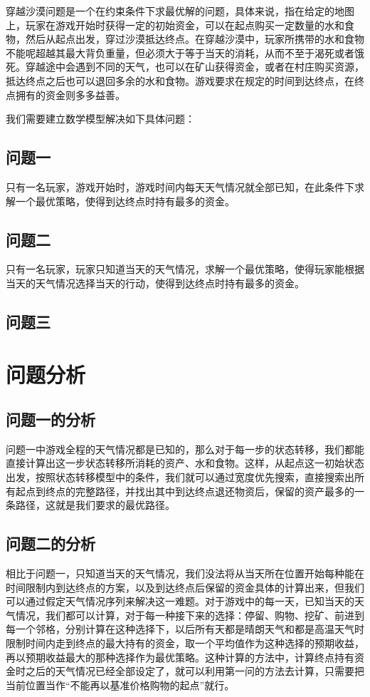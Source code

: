 \documentclass[withoutpreface,bwprint]{cumcmthesis} %
\begin{document}
穿越沙漠问题是一个在约束条件下求最优解的问题，具体来说，指在给定的地图上，玩家在游戏开始时获得一定的初始资金，可以在起点购买一定数量的水和食物，然后从起点出发，穿过沙漠抵达终点。在穿越沙漠中，玩家所携带的水和食物不能呢超越其最大背负重量，但必须大于等于当天的消耗，从而不至于渴死或者饿死。穿越途中会遇到不同的天气，也可以在矿山获得资金，或者在村庄购买资源，抵达终点之后也可以退回多余的水和食物。游戏要求在规定的时间到达终点，在终点拥有的资金则多多益善。

我们需要建立数学模型解决如下具体问题：

\subsection{问题一}
只有一名玩家，游戏开始时，游戏时间内每天天气情况就全部已知，在此条件下求解一个最优策略，使得到达终点时持有最多的资金。

\subsection{问题二}
只有一名玩家，玩家只知道当天的天气情况，求解一个最优策略，使得玩家能根据当天的天气情况选择当天的行动，使得到达终点时持有最多的资金。


\subsection{问题三}


\section{问题分析}

\subsection{问题一的分析}
问题一中游戏全程的天气情况都是已知的，那么对于每一步的状态转移，我们都能直接计算出这一步状态转移所消耗的资产、水和食物。这样，从起点这一初始状态出发，按照状态转移模型中的条件，我们就可以通过宽度优先搜索，直接搜索出所有起点到终点的完整路径，并找出其中到达终点退还物资后，保留的资产最多的一条路径，这就是我们要求的最优路径。

\subsection{问题二的分析}
相比于问题一，只知道当天的天气情况，我们没法将从当天所在位置开始每种能在时间限制内到达终点的方案，以及到达终点后保留的资金具体的计算出来，但我们可以通过假定天气情况序列来解决这一难题。对于游戏中的每一天，已知当天的天气情况，我们都可以计算，对于每一种接下来的选择：停留、购物、挖矿、前进到每一个邻格，分别计算在这种选择下，以后所有天都是晴朗天气和都是高温天气时限制时间内走到终点的最大持有的资金，取一个平均值作为这种选择的预期收益，再以预期收益最大的那种选择作为最优策略。这种计算的方法中，计算终点持有资金时之后的天气情况已经全部设定了，就可以利用第一问的方法去计算，只需要把当前位置当作“不能再以基准价格购物的起点”就行。
\end{document}
